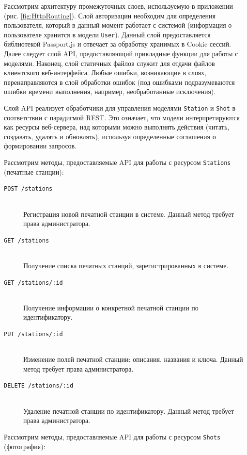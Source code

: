 \documentclass[a4paper,14pt,href,draft]{article}
\begin{document}
Рассмотрим архитектуру промежуточных слоев, используемую в приложении (рис. \ref{fig:HttpRouting}). Слой авторизации
необходим для определения пользователя, который в данный момент работает с системой (информация о пользователе хранится
в модели \texttt{User}). Данный слой предоставляется библиотекой Passport.js и отвечает за обработку хранимых в
Cookie сессий. Далее следует слой API, предоставляющий прикладные функции для работы с моделями. Наконец, слой статичных
файлов служит для отдачи файлов клиентского веб-интерфейса. Любые ошибки, возникающие в слоях, перенаправляются в слой
обработки ошибок (под ошибками подразумеваются ошибки времени выполнения, например, необработанные исключения).

Слой API реализует обработчики для управления моделями \texttt{Station} и \texttt{Shot} в соответствии с парадигмой
REST. Это означает, что модели интерпретируются как ресурсы веб-сервера, над которыми можно выполнять действия (читать,
создавать, удалять и обновлять), используя определенные соглашения о формировании запросов.

Рассмотрим методы, предоставляемые API для работы с ресурсом \texttt{Stations} (печатные станции):

\begin{description}
  \item[\texttt{POST /stations}] \hfill\\Регистрация новой печатной станции в системе. Данный метод требует права администратора.
  \item[\texttt{GET /stations}] \hfill\\Получение списка печатных станций, зарегистрированных в системе.
  \item[\texttt{GET /stations/:id}] \hfill\\Получение информации о конкретной печатной станции по идентификатору.
  \item[\texttt{PUT /stations/:id}] \hfill\\Изменение полей печатной станции: описания, названия и ключа. Данный метод требует
    права администратора.
  \item[\texttt{DELETE /stations/:id}] \hfill\\Удаление печатной станции по идентификатору. Данный метод требует права
    администратора.
\end{description}

Рассмотрим методы, предоставляемые API для работы с ресурсом \texttt{Shots} (фотография): %
\end{document}
